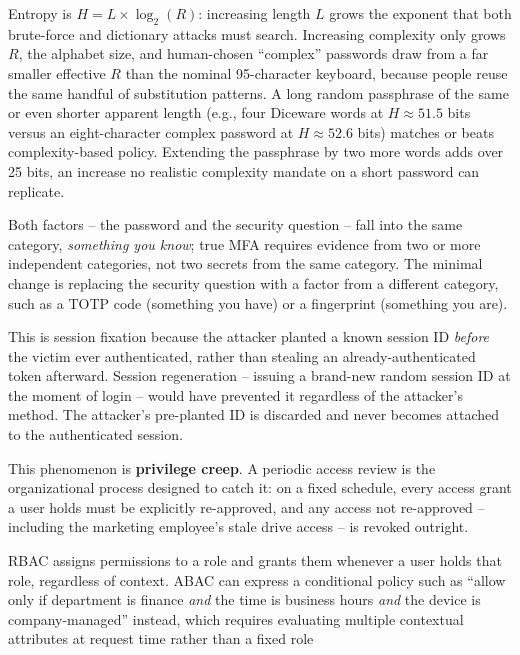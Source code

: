 \begin{answerkey}
\item Entropy is $H = L \times \log_2(R)$: increasing length $L$ grows the exponent that both
brute-force and dictionary attacks must search. Increasing complexity only grows $R$, the alphabet
size, and human-chosen ``complex'' passwords draw from a far smaller effective $R$ than the nominal
95-character keyboard, because people reuse the same handful of substitution patterns. A long
random passphrase of the same or even shorter apparent length (e.g., four Diceware words at
$H \approx 51.5$ bits versus an eight-character complex password at $H \approx 52.6$ bits) matches or
beats complexity-based policy. Extending the passphrase by two more words adds over 25 bits, an
increase no realistic complexity mandate on a short password can replicate.
\item Both factors -- the password and the security question -- fall into the same category,
\emph{something you know}; true MFA requires evidence from two or more independent categories, not
two secrets from the same category. The minimal change is replacing the security question with a
factor from a different category, such as a TOTP code (something you have) or a fingerprint
(something you are).
\item This is session fixation because the attacker planted a known session ID \emph{before} the
victim ever authenticated, rather than stealing an already-authenticated token afterward. Session
regeneration -- issuing a brand-new random session ID at the moment of login -- would have
prevented it regardless of the attacker's method. The attacker's pre-planted ID is discarded and
never becomes attached to the authenticated session.
\item This phenomenon is \textbf{privilege creep}. A periodic access review is the organizational
process designed to catch it: on a fixed schedule, every access grant a user holds must be explicitly
re-approved, and any access not re-approved -- including the marketing employee's stale drive access
-- is revoked outright.
\item RBAC assigns permissions to a role and grants them whenever a user holds that role,
regardless of context. ABAC can express a conditional policy such as ``allow only if department is
finance \emph{and} the time is business hours \emph{and} the device is company-managed'' instead,
which requires evaluating multiple contextual attributes at request time rather than a fixed role

\end{answerkey}
